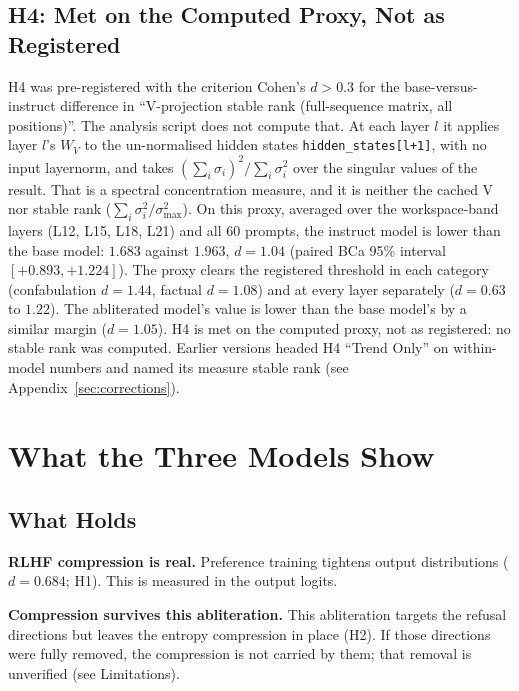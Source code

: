 \documentclass[11pt,a4paper]{article}
\begin{document}
\subsection{H4: Met on the Computed Proxy, Not as Registered}

H4 was pre-registered with the criterion Cohen's $d > 0.3$ for the
base-versus-instruct difference in ``V-projection stable rank
(full-sequence matrix, all positions)''. The analysis script does not
compute that. At each layer $l$ it applies layer $l$'s $W_V$ to the
un-normalised hidden states \texttt{hidden\_states[l+1]}, with no input
layernorm, and takes $(\sum_i \sigma_i)^2 / \sum_i \sigma_i^2$ over the
singular values of the result. That is a spectral concentration
measure, and it is neither the cached V nor stable rank
($\sum_i \sigma_i^2 / \sigma_{\max}^2$). On this proxy, averaged over
the workspace-band layers (L12, L15, L18, L21) and all 60 prompts, the
instruct model is lower than the base model: $1.683$ against $1.963$,
$d = 1.04$ (paired BCa 95\% interval $[+0.893, +1.224]$). The proxy
clears the registered threshold in each category (confabulation
$d = 1.44$, factual $d = 1.08$) and at every layer separately
($d = 0.63$ to $1.22$). The abliterated model's value is lower than the
base model's by a similar margin ($d = 1.05$). H4 is met on the
computed proxy, not as registered: no stable rank was computed.
Earlier versions headed H4 ``Trend Only'' on within-model numbers and
named its measure stable rank (see Appendix~\ref{sec:corrections}).

\section{What the Three Models Show}
\label{sec:discussion}

\subsection{What Holds}

\textbf{RLHF compression is real.} Preference training tightens
output distributions ($d{=}0.684$; H1). This is measured in the output
logits.

\textbf{Compression survives this abliteration.} This abliteration targets the
refusal directions but leaves the entropy compression in place (H2).
If those directions were fully removed, the compression is not
carried by them; that removal is unverified (see Limitations).
\end{document}
